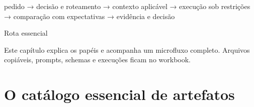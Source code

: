 \documentclass[
  10pt,
  a4paper,
  oneside]{book}
\newenvironment{Shaded}{}{}
\newcommand{\NormalTok}[1]{#1}
\renewenvironment{Shaded}{\begin{snugshade}}{\end{snugshade}}%
\begin{document}
\begin{Shaded}
\begin{Highlighting}[]
\NormalTok{pedido}
\NormalTok{→ decisão e roteamento}
\NormalTok{→ contexto aplicável}
\NormalTok{→ execução sob restrições}
\NormalTok{→ comparação com expectativas}
\NormalTok{→ evidência e decisão}
\end{Highlighting}
\end{Shaded}


\begin{tipbox}{Rota essencial}

Este capítulo explica os papéis e acompanha um microfluxo completo.
Arquivos copiáveis, prompts, schemas e execuções ficam no workbook.

\end{tipbox}

\hypertarget{o-catuxe1logo-essencial-de-artefatos}{%
\section{O catálogo essencial de
artefatos}\label{o-catuxe1logo-essencial-de-artefatos}}
\end{document}
